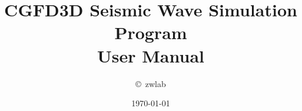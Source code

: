 \documentclass[oneside,english]{book}
\begin{document}


\title{\textbf{CGFD3D Seismic Wave Simulation Program}\\
       \textbf{User Manual}}
 

\author{\copyright \, zwlab}

\date{\today}

\maketitle


\newpage{}



\newpage

\tableofcontents


%











\appendix

%

\end{document}
